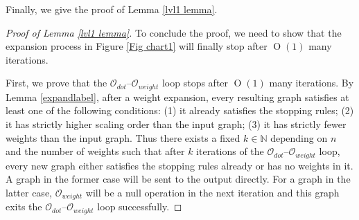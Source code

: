 \documentclass{article}
\newcommand{\1}{\mathds{1}}
\numberwithin{equation}{section}
\renewcommand{\cal}{\mathcal}
\newcommand{\N}{\mathbb{N}}
\DeclareMathOperator{\OO}{O}
\theoremstyle{plain} %
\theoremstyle{remark}
\begin{document}
Finally, we give the proof of Lemma \ref{lvl1 lemma}.
\begin{proof}[Proof of Lemma \ref{lvl1 lemma}]
To conclude the proof, we need to show that the expansion process in Figure \ref{Fig chart1} will finally stop after $\OO(1)$ many iterations. 

\vspace{5pt}

\noindent{\bf The $\cal O_{dot}$--${\cal O}_{weight}$ loop.} First, we prove that the $\cal O_{dot}$--${\cal O}_{weight}$ loop stops after $\OO(1)$ many iterations. By Lemma \ref{expandlabel}, after a weight expansion, every resulting graph satisfies 
at least one of the following conditions: (1) it already satisfies the stopping rules; (2) it has strictly higher scaling order than the input graph; (3) it has strictly fewer weights than the input graph. 
Thus there exists a fixed $k\in \N$ depending on $n$ and the number of weights such that after $k$ iterations of the $\cal O_{dot}$--${\cal O}_{weight}$ loop, every new graph either satisfies the stopping rules already or has no weights in it. A graph in the former case will be sent to the output directly. For a graph in the latter case, ${\cal O}_{weight}$ will be a null operation in the next iteration and this graph exits the $\cal O_{dot}$--${\cal O}_{weight}$ loop successfully.

\vspace{5pt}




\end{proof}
\end{document}
